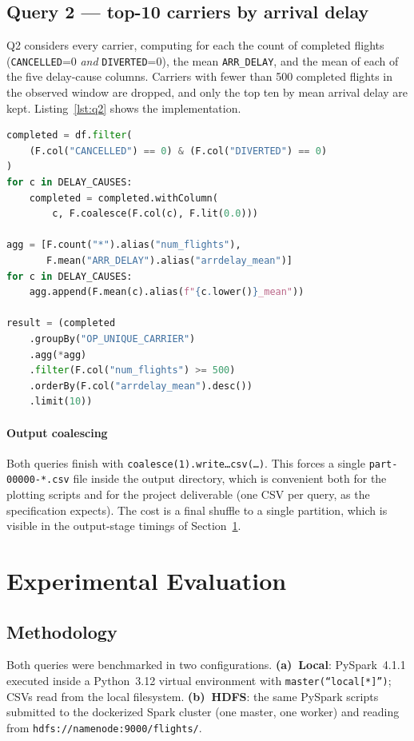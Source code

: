 \documentclass[conference]{IEEEtran}
\begin{document}
\subsection{Query 2 --- top-10 carriers by arrival delay}

Q2 considers every carrier, computing for each the count of
completed flights (\texttt{CANCELLED}=0 \emph{and}
\texttt{DIVERTED}=0), the mean \texttt{ARR\_DELAY}, and the
mean of each of the five delay-cause columns. Carriers with
fewer than 500 completed flights in the observed window are
dropped, and only the top ten by mean arrival delay are kept.
Listing~\ref{lst:q2} shows the implementation.

\begin{lstlisting}[language=Python,
    caption={Core of Query 2.},
    label={lst:q2}]
completed = df.filter(
    (F.col("CANCELLED") == 0) & (F.col("DIVERTED") == 0)
)
for c in DELAY_CAUSES:
    completed = completed.withColumn(
        c, F.coalesce(F.col(c), F.lit(0.0)))

agg = [F.count("*").alias("num_flights"),
       F.mean("ARR_DELAY").alias("arrdelay_mean")]
for c in DELAY_CAUSES:
    agg.append(F.mean(c).alias(f"{c.lower()}_mean"))

result = (completed
    .groupBy("OP_UNIQUE_CARRIER")
    .agg(*agg)
    .filter(F.col("num_flights") >= 500)
    .orderBy(F.col("arrdelay_mean").desc())
    .limit(10))
\end{lstlisting}

\paragraph{Output coalescing}
Both queries finish with
\texttt{coalesce(1).write\ldots csv(\ldots)}. This forces a
single \texttt{part-00000-*.csv} file inside the output
directory, which is convenient both for the plotting scripts and
for the project deliverable (one CSV per query, as the
specification expects). The cost is a final shuffle to a single
partition, which is visible in the output-stage timings of
Section~\ref{sec:eval}.

\section{Experimental Evaluation}\label{sec:eval}

\subsection{Methodology}
Both queries were benchmarked in two configurations.
\textbf{(a)~Local}: PySpark~4.1.1 executed inside a Python~3.12
virtual environment with \texttt{master(``local[*]'')}; CSVs read
from the local filesystem.
\textbf{(b)~HDFS}: the same PySpark scripts submitted to the
dockerized Spark cluster (one master, one worker) and reading
from \texttt{hdfs://namenode:9000/flights/}.
\end{document}
